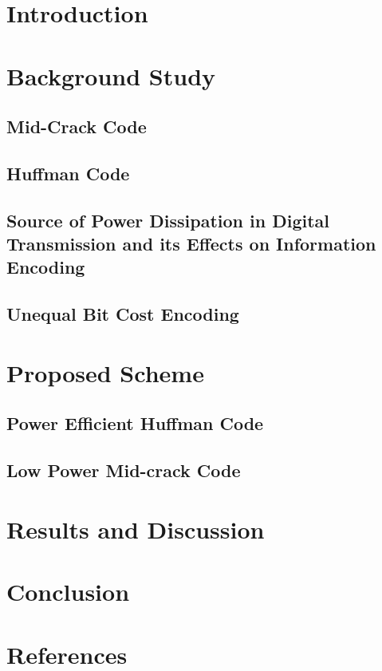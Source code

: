 \documentclass[preprint]{elsarticle} %
\begin{document}
\linenumbers

\section{Introduction}
  



\section{Background Study}
\label{sec2}
\subsection{Mid-Crack Code}
\subsection{Huffman Code}

\subsection{Source of Power Dissipation in Digital Transmission and its Effects on Information Encoding}
     
\subsection{Unequal Bit Cost Encoding}


   
\section{Proposed Scheme}
\label{sec3}
\subsection{Power Efficient Huffman Code}
\subsection{Low Power Mid-crack Code}



\section{Results and Discussion}
\label{sec4}


\section{Conclusion}
\label{sec5}
        
\section*{References}


\end{document}
